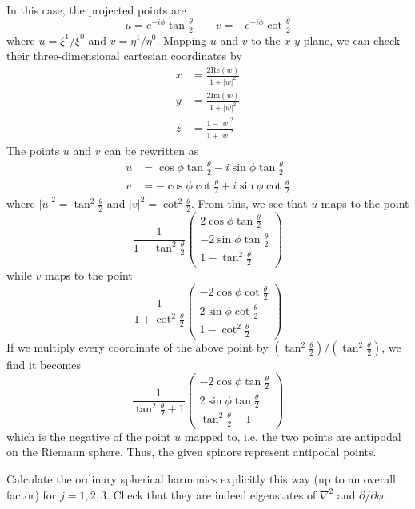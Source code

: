 \documentclass[../road-to-reality.tex]{subfiles}
\begin{document}
\begin{questions}
\begin{solution}
	In this case, the projected points are
	\[
		u = e^{-i\phi}\tan\tfrac{\theta}{2} \qquad v = -e^{-i\phi}\cot\tfrac{\theta}{2}
	\]
	where $u = \xi^1/\xi^0$ and $v = \eta^1/\eta^0$. Mapping $u$ and $v$ to the $x$-$y$ plane, we can check their three-dimensional cartesian coordinates by
	\begin{align*}
		x &= \frac{2\mathrm{Re}(w)}{1 + |w|^2} \\
		y &= \frac{2\mathrm{Im}(w)}{1 + |w|^2} \\
		z &= \frac{1 - |w|^2}{1 + |w|^2}
	\end{align*}
	The points $u$ and $v$ can be rewritten as
	\begin{align*}
		u &= \cos\phi\tan\tfrac{\theta}{2} - i\sin\phi\tan\tfrac{\theta}{2} \\
		v &= {-\cos\phi\cot\tfrac{\theta}{2}} + i\sin\phi\cot\tfrac{\theta}{2}
	\end{align*}
	where $|u|^2 = \tan^2\tfrac{\theta}{2}$ and $|v|^2 = \cot^2\tfrac{\theta}{2}$. From this, we see that $u$ maps to the point
	\[
		\frac{1}{1 + \tan^2\tfrac{\theta}{2}}\begin{pmatrix}2\cos\phi\tan\tfrac{\theta}{2} \\ -2\sin\phi\tan\tfrac{\theta}{2} \\ 1 - \tan^2\tfrac{\theta}{2}\end{pmatrix}
	\]
	while $v$ maps to the point
	\[
	\frac{1}{1 + \cot^2\tfrac{\theta}{2}}\begin{pmatrix}-2\cos\phi\cot\tfrac{\theta}{2} \\ 2\sin\phi\cot\tfrac{\theta}{2} \\ 1 - \cot^2\tfrac{\theta}{2}\end{pmatrix}
	\]
	If we multiply every coordinate of the above point by $(\tan^2\tfrac{\theta}{2})/( \tan^2\tfrac{\theta}{2})$, we find it becomes 
	\[
	\frac{1}{\tan^2\tfrac{\theta}{2} + 1}\begin{pmatrix}-2\cos\phi\tan\tfrac{\theta}{2} \\ 2\sin\phi\tan\tfrac{\theta}{2} \\ \tan^2\tfrac{\theta}{2} - 1\end{pmatrix}
	\]
	which is the negative of the point $u$ mapped to, i.e. the two points are antipodal on the Riemann sphere. Thus, the given spinors represent antipodal points.
\end{solution}

\question Calculate the ordinary spherical harmonics explicitly this way (up to an overall factor) for $j = 1,2,3$. Check that they are indeed eigenstates of $\nabla^2$ and $\partial/\partial\phi$.


\end{questions}
\end{document}
